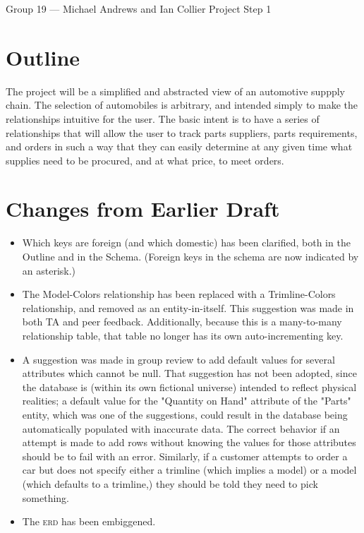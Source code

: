 \documentclass[11pt,letterpaper,oneside]{amsart}
\begin{document}
Group 19 --- Michael Andrews and Ian Collier
Project Step 1

\section*{Outline}

The project will be a simplified and abstracted view of an automotive suppply chain.  The selection of automobiles is arbitrary, and intended simply to make the relationships intuitive for the user.  The basic intent is to have a series of relationships that will allow the user to track parts suppliers, parts requirements, and orders in such a way that they can easily determine at any given time what supplies need to be procured, and at what price, to meet orders.

\section*{Changes from Earlier Draft}

\begin{itemize}

\item Which keys are foreign (and which domestic) has been clarified, both in the Outline and in the Schema.  (Foreign keys in the schema are now indicated by an asterisk.)

\item The Model-Colors relationship has been replaced with a Trimline-Colors relationship, and removed as an entity-in-itself.  This suggestion was made in both TA and peer feedback.  Additionally, because this is a many-to-many relationship table, that table no longer has its own auto-incrementing key.

\item A suggestion was made in group review to add default values for several attributes which cannot be null.  That suggestion has not been adopted, since the database is (within its own fictional universe) intended to reflect physical realities; a default value for the "Quantity on Hand" attribute of the "Parts" entity, which was one of the suggestions, could result in the database being automatically populated with inaccurate data.  The correct behavior if an attempt is made to add rows without knowing the values for those attributes should be to fail with an error.  Similarly, if a customer attempts to order a car but does not specify either a trimline (which implies a model) or a model (which defaults to a trimline,) they should be told they need to pick something.

\item The \textsc{erd} has been embiggened.

\end{itemize}
\end{document}
